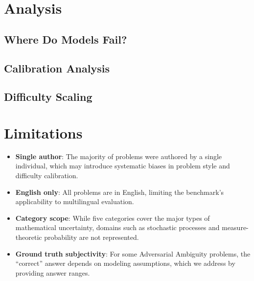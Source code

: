 \documentclass{article}
\begin{document}
\section{Analysis}
\label{sec:analysis}


\subsection{Where Do Models Fail?}

\subsection{Calibration Analysis}

\subsection{Difficulty Scaling}


\section{Limitations}
\label{sec:limitations}

\begin{itemize}
    \item \textbf{Single author}: The majority of problems were authored by a single individual, which may introduce systematic biases in problem style and difficulty calibration.
    \item \textbf{English only}: All problems are in English, limiting the benchmark's applicability to multilingual evaluation.
    \item \textbf{Category scope}: While five categories cover the major types of mathematical uncertainty, domains such as stochastic processes and measure-theoretic probability are not represented.
    \item \textbf{Ground truth subjectivity}: For some Adversarial Ambiguity problems, the ``correct'' answer depends on modeling assumptions, which we address by providing answer ranges.
\end{itemize}


\end{document}
